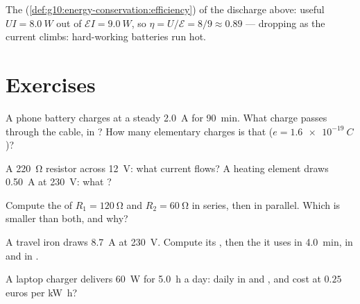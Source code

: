 \begin{example}\label{ex:g11:circuits-and-power:efficiency}
The  (\cref{def:g10:energy-conservation:efficiency}) of the
discharge above: useful $UI = \qty{8.0}{W}$ out of $\mathcal{E}I =
\qty{9.0}{W}$, so $\eta = U/\mathcal{E} = 8/9 \approx 0.89$ --- dropping
as the current climbs: hard-working batteries run hot.
\end{example}

\section{Exercises}

\begin{exercise}[$\star$]\label{exo:g11:circuits-and-power:1}
A phone battery charges at a steady \qty{2.0}{A} for \qty{90}{min}. What
charge passes through the cable, in ? How many elementary charges
is that ($e = \qty{1.6e-19}{C}$)?
\end{exercise}

\begin{exercise}[$\star$]\label{exo:g11:circuits-and-power:2}
A \qty{220}{\ohm} resistor across \qty{12}{V}: what current flows? A
heating element draws \qty{0.50}{A} at \qty{230}{V}: what ?
\end{exercise}

\begin{exercise}[$\star$]\label{exo:g11:circuits-and-power:3}
Compute the  of $R_1 = \qty{120}{\ohm}$ and $R_2 =
\qty{60}{\ohm}$ in series, then in parallel. Which is smaller than both,
and why?
\end{exercise}

\begin{exercise}[$\star$]\label{exo:g11:circuits-and-power:4}
A travel iron draws \qty{8.7}{A} at \qty{230}{V}. Compute its , then
the  it uses in \qty{4.0}{min}, in  and in .
\end{exercise}

\begin{exercise}[$\star$]\label{exo:g11:circuits-and-power:5}
A laptop charger delivers \qty{60}{W} for \qty{5.0}{h} a day: daily
 in  and , and cost at $0.25$ euros per
\unit{kW.h}?
\end{exercise}

